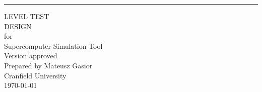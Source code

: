 \begin{flushright}
    \rule{16cm}{5pt}\vskip1cm
    \begin{bfseries}
        \Huge{LEVEL TEST\\ DESIGN}\\
        \vspace{1.9cm}
        for\\
        \vspace{1.9cm}
	    Supercomputer Simulation Tool\\
        \vspace{1.9cm}
        \LARGE{Version \myversion approved}\\
        \vspace{1.9cm}
        Prepared by Mateusz Gasior\\
        \vspace{1.9cm}
        Cranfield University\\
        \vspace{1.9cm}
        \today\\
    \end{bfseries}
\end{flushright}